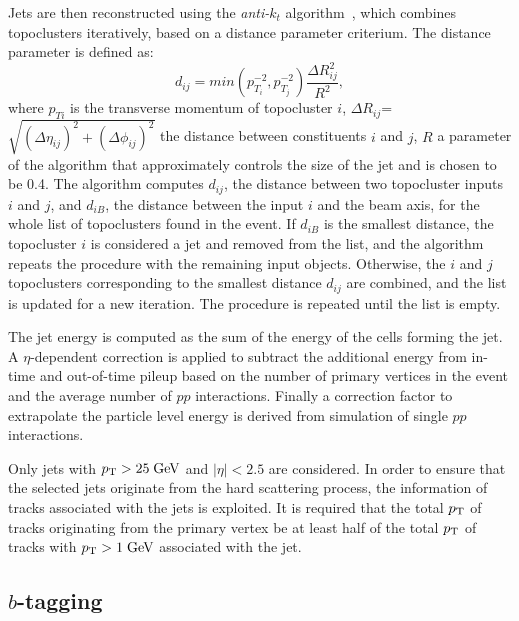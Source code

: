 Jets are then reconstructed using the {\it anti-$k_t$}
algorithm~\cite{antiktalgo}, which combines topoclusters iteratively,
based on a distance parameter criterium. The distance parameter is
defined as:
\begin{equation}
d_{ij}=min(p_{T_i}^{-2},p_{T_j}^{-2})\frac{\Delta R_{ij}^{2}}{R^{2}},
\end{equation}
where $p_{Ti}$ is the transverse momentum of topocluster $i$, 
$\Delta R_{ij}$=$\sqrt{(\Delta\eta_{ij})^{2}+(\Delta\phi_{ij})^{2}}$ the distance 
between constituents $i$ and
$j$, $R$ a parameter of the algorithm that approximately controls the size
of the jet and is chosen to be 0.4.
The algorithm computes $d_{ij}$, the distance between two topocluster
inputs $i$ and $j$, and $d_{iB}$,  the distance between the input $i$
and the beam axis, for the whole list of topoclusters found in the
event. If $d_{iB}$ is the smallest distance, the
topocluster $i$ is considered a jet and removed from the list, and the
algorithm repeats the procedure with the remaining input objects.
Otherwise, the $i$ and $j$ topoclusters corresponding to the smallest
distance $d_{ij}$ are combined, and the list is updated for a new
iteration.
The procedure is repeated until the list is empty.

The jet energy is computed as the sum of the energy of the cells
forming the jet.
A $\eta$-dependent correction is applied to subtract the additional
energy from in-time and out-of-time pileup based on the number of
primary vertices in the event and the average number of $pp$
interactions.
Finally a correction factor to extrapolate the particle level energy
is derived from simulation of single $pp$ interactions.

Only jets with $p_{\mathrm{T}}{}>25 \; \mathrm{GeV}{}$ and $|\eta|<2.5$ are considered. In
order to ensure that the selected jets originate from the hard
scattering process, the information of tracks associated with the jets
is exploited.
It is required that the total $p_{\mathrm{T}}{}$ of tracks originating from the
primary vertex be at least half of the total $p_{\mathrm{T}}$ of tracks with
$p_{\mathrm{T}}{}>1\; \mathrm{GeV}{}$ associated with the jet.

\subsection{$b$-tagging}
\label{sec:btag}


